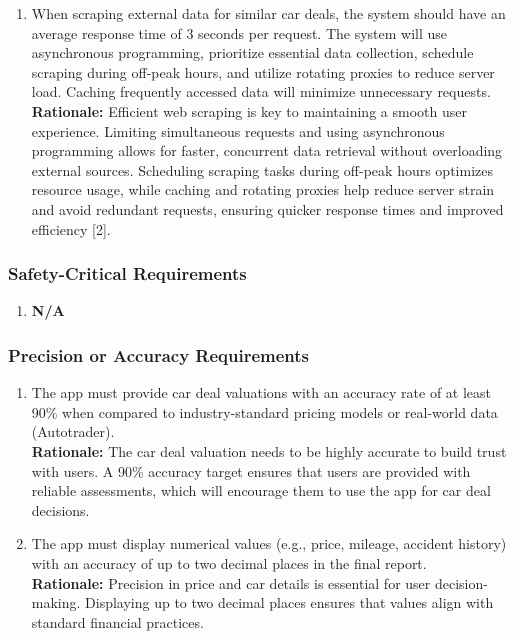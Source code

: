 \documentclass[]{article}
\begin{document}
\begin{enumerate}
\begin{enumerate}[{PR-SL}1.]
    \item When scraping external data for similar car deals, the system should have an average response time of 3 seconds per request. The system will use asynchronous programming, prioritize essential data collection, schedule scraping during off-peak hours, and utilize rotating proxies to reduce server load. Caching frequently accessed data will minimize unnecessary requests.  \\
    \textbf{Rationale:} Efficient web scraping is key to maintaining a smooth user experience. Limiting simultaneous requests and using asynchronous programming allows for faster, concurrent data retrieval without overloading external sources. Scheduling scraping tasks during off-peak hours optimizes resource usage, while caching and rotating proxies help reduce server strain and avoid redundant requests, ensuring quicker response times and improved efficiency [2].
\end{enumerate}

\subsubsection{Safety-Critical Requirements}
\label{ssub:safety_critical_requirements}
\begin{enumerate}[{PR-SC}1.]
    \item \textbf{N/A}
\end{enumerate}

\subsubsection{Precision or Accuracy Requirements}
\label{ssub:precision_or_accuracy_requirements}
\begin{enumerate}[{PR-PA}1.]
    \item The app must provide car deal valuations with an accuracy rate of at least 90\% when compared to industry-standard pricing models or real-world data (Autotrader). \\ 
    \textbf{Rationale:} The car deal valuation needs to be highly accurate to build trust with users. A 90\% accuracy target ensures that users are provided with reliable assessments, which will encourage them to use the app for car deal decisions.

    \item The app must display numerical values (e.g., price, mileage, accident history) with an accuracy of up to two decimal places in the final report.  \\
    \textbf{Rationale:} Precision in price and car details is essential for user decision-making. Displaying up to two decimal places ensures that values align with standard financial practices.


\end{enumerate}
\end{enumerate}
\end{document}
